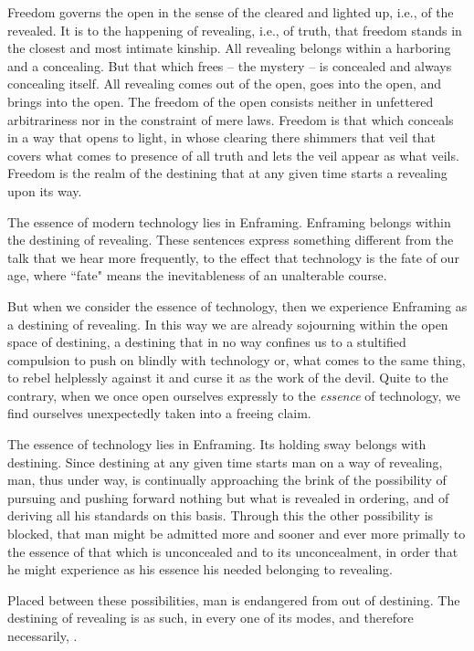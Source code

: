Freedom governs the open in the sense of the cleared and lighted up, i.e., of the revealed. It is to the happening of revealing, i.e., of truth, that freedom stands in the closest and most intimate kinship. All revealing belongs within a harboring and a concealing. But that which frees -- the mystery -- is concealed and always concealing itself. All revealing comes out of the open, goes into the open, and brings into the open. The freedom of the open consists neither in unfettered arbitrariness nor in the constraint of mere laws. Freedom is that which conceals in a way that opens to light, in whose clearing there shimmers that veil that covers what comes to presence of all truth and lets the veil appear as what veils. Freedom is the realm of the destining that at any given time starts a revealing upon its way.

The essence of modern technology lies in Enframing. Enframing belongs within the destining of revealing. These sentences express something different from the talk that we hear more frequently, to the effect that technology is the fate of our age, where ``fate" means the inevitableness of an unalterable course.

But when we consider the essence of technology, then we experience Enframing as a destining of revealing. In this way we are already sojourning within the open space of destining, a destining that in no way confines us to a stultified compulsion to push on blindly with technology or, what comes to the same thing, to rebel helplessly against it and curse it as the work of the devil. Quite to the contrary, when we once open ourselves expressly to the \textit{essence} of technology, we find ourselves unexpectedly taken into a freeing claim.

The essence of technology lies in Enframing. Its holding sway belongs with destining. Since destining at any given time starts man on a way of revealing, man, thus under way, is continually approaching the brink of the possibility of pursuing and pushing forward nothing but what is revealed in ordering, and of deriving all his standards on this basis. Through this the other possibility is blocked, that man might be admitted more and sooner and ever more primally to the essence of that which is unconcealed and to its unconcealment, in order that he might experience as his essence his needed belonging to revealing.

Placed between these possibilities, man is endangered from out of destining. The destining of revealing is as such, in every one of its modes, and therefore necessarily, .

